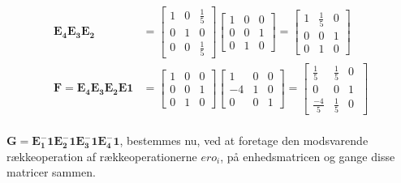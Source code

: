 \documentclass[12pt]{article}
\begin{document}
\begin{align*}
\mathbf{E_4E_3E_2}&=
\begin{bmatrix}
1&0&\frac{1}{5}\\
0&1&0\\
0&0&\frac{1}{5}
\end{bmatrix}
\begin{bmatrix}
1&0&0\\
0&0&1\\
0&1&0
\end{bmatrix}
=
\begin{bmatrix}
1&\frac{1}{5}&0\\
0&0&1\\
0&1&0
\end{bmatrix}
\\
\mathbf{F=E_4E_3E_2E1}&=
\begin{bmatrix}
1&0&0\\
0&0&1\\
0&1&0
\end{bmatrix}
\begin{bmatrix}
1&0&0\\
-4&1&0\\
0&0&1
\end{bmatrix}
=
\begin{bmatrix}
\frac{1}{5}&\frac{1}{5}&0\\
0&0&1\\
\frac{-4}{5}&\frac{1}{5}&0\
\end{bmatrix}
\end{align*}
\\
$ \mathbf{G=E_1^-1E_2^-1E_3^-1E_4^-1}$, bestemmes nu, ved at foretage den modsvarende rækkeoperation af rækkeoperationerne $ero_i$, på enhedsmatricen og gange disse matricer sammen.
\end{document}
